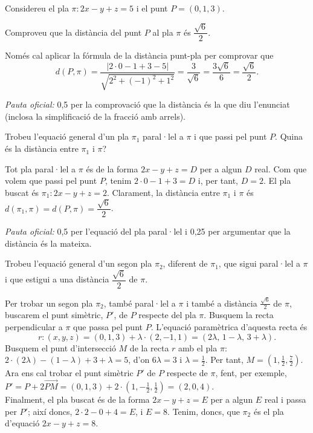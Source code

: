 Considereu el pla $\pi\colon2x-y+z=5$ i el punt $P=(0,1,3)$.

\begin{apartats}

Comproveu que la distància del punt $P$ al pla $\pi$ és $\dfrac{\sqrt6}{2}$.

\begin{solucio}
Només cal aplicar la fórmula de la distància punt-pla per comprovar que
\[
d(P,\pi)=\frac{|2\cdot0-1+3-5|}{\sqrt{2^2+(-1)^2+1^2}}=\frac{3}{\sqrt6}=\frac{3\sqrt6}{6}=\frac{\sqrt6}{2}.
\]

\textit{Pauta oficial:} 0,5 per la comprovació que la distància és la que diu l'enunciat (inclosa la
simplificació de la fracció amb arrels).
\end{solucio}

Trobeu l'equació general d'un pla $\pi_1$ paral·lel a $\pi$ i que passi pel punt $P$. Quina és la distància entre
$\pi_1$ i $\pi$?

\begin{solucio}
Tot pla paral·lel a $\pi$ és de la forma $2x-y+z=D$ per a algun $D$ real. Com que volem que passi pel punt $P$,
tenim $2\cdot0-1+3=D$ i, per tant, $D=2$. El pla buscat és $\pi_1\colon2x-y+z=2$. Clarament, la distància entre
$\pi_1$ i $\pi$ és $d(\pi_1,\pi)=d(P,\pi)=\dfrac{\sqrt6}{2}$.

\textit{Pauta oficial:} 0,5 per l'equació del pla paral·lel i 0,25 per argumentar que la distància és la
mateixa.
\end{solucio}

Trobeu l'equació general d'un segon pla $\pi_2$, diferent de $\pi_1$, que sigui paral·lel a $\pi$ i que estigui a
una distància $\dfrac{\sqrt6}{2}$ de $\pi$.

\begin{solucio}
Per trobar un segon pla $\pi_2$, també paral·lel a $\pi$ i també a distància $\frac{\sqrt6}{2}$ de $\pi$,
buscarem el punt simètric, $P'$, de $P$ respecte del pla $\pi$. Busquem la recta perpendicular a $\pi$ que passa
pel punt $P$. L'equació paramètrica d'aquesta recta és
\[
r\colon(x,y,z)=(0,1,3)+\lambda\cdot(2,-1,1)=(2\lambda,\,1-\lambda,\,3+\lambda).
\]
Busquem el punt d'intersecció $M$ de la recta $r$ amb el pla $\pi$: $2\cdot(2\lambda)-(1-\lambda)+3+\lambda=5$,
d'on $6\lambda=3$ i $\lambda=\frac12$. Per tant, $M=\left(1,\frac12,\frac72\right)$. Ara ens cal trobar el punt
simètric $P'$ de $P$ respecte de $\pi$, fent, per exemple,
$P'=P+2\overrightarrow{PM}=(0,1,3)+2\cdot\left(1,-\frac12,\frac12\right)=(2,0,4)$.\\
Finalment, el pla buscat és de la forma $2x-y+z=E$ per a algun $E$ real i passa per $P'$; així doncs,
$2\cdot2-0+4=E$, i $E=8$. Tenim, doncs, que $\pi_2$ és el pla d'equació $2x-y+z=8$.


\end{solucio}
\end{apartats}
